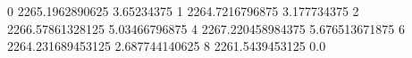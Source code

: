 0 2265.1962890625 3.65234375
1 2264.7216796875 3.177734375
2 2266.57861328125 5.03466796875
4 2267.220458984375 5.676513671875
6 2264.231689453125 2.687744140625
8 2261.5439453125 0.0
